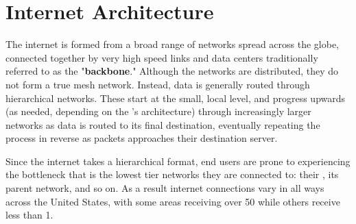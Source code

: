 \section{Internet Architecture}\label{sec:background_internet_architecture}

The internet is formed from a broad range of networks spread across the globe, connected together by very high speed links and data centers traditionally referred to as the "\textbf{backbone}." Although the networks are distributed, they do not form a true mesh network. Instead, data is generally routed through hierarchical networks. These start at the small, local level, and progress upwards (as needed, depending on the \isp's architecture) through increasingly larger networks as data is routed to its final destination, eventually repeating the process in reverse as packets approaches their destination server.

Since the internet takes a hierarchical format, end users are prone to experiencing the bottleneck that is the lowest tier networks they are connected to: their \isp, its parent network, and so on. As a result internet connections vary in all ways across the United States, with some areas receiving over 50 \mbps while others receive less than 1. 